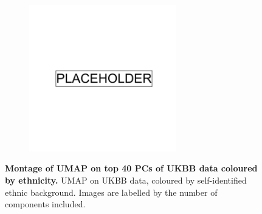 \begin{figure}[ht]
    \centering
    \begin{subfigure}{0.95\textwidth}
    \includegraphics[width=0.7\textwidth]{placeholder.png}
    \end{subfigure}
    \caption[Montage of UMAP on top 40 PCs of UKBB data coloured by ethnicity]{\textbf{Montage of UMAP on top 40 PCs of UKBB data coloured by ethnicity.} UMAP on UKBB data, coloured by self-identified ethnic background. Images are labelled by the number of components included.}
    \label{fig:supp_montage_ukbb_eth}
\end{figure}

\newpage

